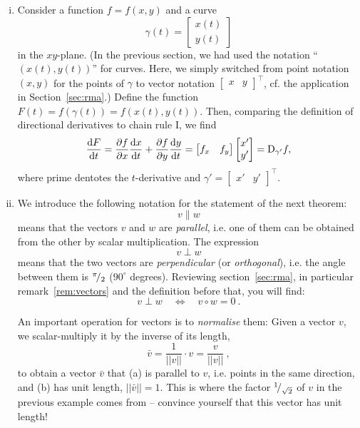 \begin{remark}
\label{rem:gradient_and_dd}
\begin{enumerate}[(i)]
	\item Consider a function $f=f(x,y)$ and a curve
	\[ \gamma(t) = \begin{bmatrix}
	x(t) \\ y(t)
	\end{bmatrix} \]
	in the $xy$-plane. (In the previous section, we had used the notation ``$(x(t),y(t))$'' for curves. Here, we simply switched from point notation $(x, y)$ for the points of $\gamma$ to vector notation $\begin{bmatrix} x & y \end{bmatrix}^\top$, cf. the application in Section~\ref{sec:rma}.) Define the function $F(t)=f(\gamma(t))=f(x(t),y(t))$. Then, comparing the definition of directional derivatives to chain rule I, we find
	\[ \displaystyle{\frac{\mathrm{d}F}{\mathrm{d}t}} = \displaystyle{\frac{\partial f}{\partial x}}\displaystyle{\frac{\mathrm{d}x}{\mathrm{d}t}} + \displaystyle{\frac{\partial f}{\partial y}}\displaystyle{\frac{\mathrm{d}y}{\mathrm{d}t}}
	 = \begin{bmatrix} f_x & f_y \end{bmatrix} \begin{bmatrix}	x' \\ y' \end{bmatrix}
	 = \mathrm{D}_{\gamma'}f , \]
	where prime dentotes the $t$-derivative and $\gamma'=\begin{bmatrix} x' & y' \end{bmatrix}^\top$.
	\item We introduce the following notation for the statement of the next theorem:
	\[ v \parallel w \]
	means that the vectors $v$ and $w$ are \emph{parallel}, i.e. one of them can be obtained from the other by scalar multiplication. The expression
	\[ v \perp w \]
	means that the two vectors are \emph{perpendicular} (or \emph{orthogonal}), i.e. the angle between them is ${}^{\pi}\!/_{2}$ ($90^\circ$ degrees). Reviewing section~\ref{sec:rma}, in particular remark~\ref{rem:vectors} and the definition before that, you will find:
	\[ v \perp w \quad \Longleftrightarrow \quad v \circ w = 0 \:. \]
	
	An important operation for vectors is to \emph{normalise} them: Given a vector $v$, we scalar-multiply it by the inverse of its length,
	\[ \bar{v} = \frac{1}{||v||} \cdot v = \frac{v}{||v||} \:, \]
	to obtain a vector $\bar{v}$ that (a) is parallel to $v$, i.e. points in the same direction, and (b) has unit length, $||\bar{v}||=1$. This is where the factor ${}^{1}\!/_{\sqrt{2}}$ of $v$ in the previous example comes from -- convince yourself that this vector has unit length! 
\end{enumerate}
\end{remark}

